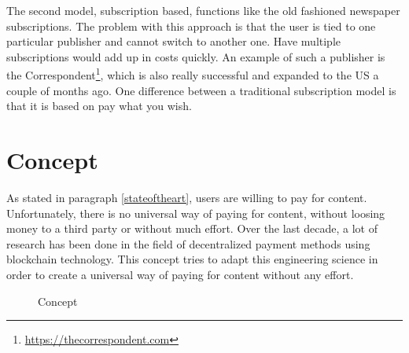 \documentclass[a4paper]{article}
\begin{document}
The second model, subscription based, functions like the old fashioned newspaper subscriptions.  The problem with this approach is that the user is tied to one particular publisher and cannot switch to another one. Have multiple subscriptions would add up in costs quickly. An example of such a publisher is the Correspondent\footnote{\url{https://thecorrespondent.com}}, which is also really successful and expanded to the US a couple of months ago. One difference between a traditional subscription model is that it is based on pay what you wish.

\section {Concept}
As stated in paragraph \ref{stateoftheart}, users are willing to pay for content. Unfortunately, there is no universal way of paying for content, without loosing money to a third party or without much effort. Over the last decade, a lot of research has been done in the field of decentralized payment methods using blockchain technology. This concept tries to adapt this engineering science in order to create a universal way of paying for content without any effort. 

\newpage

\begin{figure}[htbp]
	
	\caption{Concept}
\end{figure}
\end{document}

